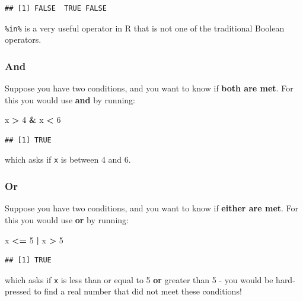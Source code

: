 \documentclass[]{book}
\newenvironment{Shaded}{\begin{snugshade}}{\end{snugshade}}
\newcommand{\DecValTok}[1]{\textcolor[rgb]{0.00,0.00,0.81}{#1}}
\newcommand{\NormalTok}[1]{#1}
\newcommand{\OperatorTok}[1]{\textcolor[rgb]{0.81,0.36,0.00}{\textbf{#1}}}
\newcommand{\StringTok}[1]{\textcolor[rgb]{0.31,0.60,0.02}{#1}}
\begin{document}
\begin{verbatim}
## [1] FALSE  TRUE FALSE
\end{verbatim}

\texttt{\%in\%} is a very useful operator in R that is not one of the traditional Boolean operators.

\hypertarget{and}{%
\subsubsection*{And}\label{and}}

Suppose you have two conditions, and you want to know if \textbf{both are met}. For this you would use \textbf{and} by running:

\begin{Shaded}
\begin{Highlighting}[]
\NormalTok{x }\OperatorTok{>}\StringTok{ }\DecValTok{4} \OperatorTok{&}\StringTok{ }\NormalTok{x }\OperatorTok{<}\StringTok{ }\DecValTok{6}
\end{Highlighting}
\end{Shaded}

\begin{verbatim}
## [1] TRUE
\end{verbatim}

which asks if \texttt{x} is between 4 and 6.

\hypertarget{or}{%
\subsubsection*{Or}\label{or}}

Suppose you have two conditions, and you want to know if \textbf{either are met}. For this you would use \textbf{or} by running:

\begin{Shaded}
\begin{Highlighting}[]
\NormalTok{x }\OperatorTok{<=}\StringTok{ }\DecValTok{5} \OperatorTok{|}\StringTok{ }\NormalTok{x }\OperatorTok{>}\StringTok{ }\DecValTok{5}
\end{Highlighting}
\end{Shaded}

\begin{verbatim}
## [1] TRUE
\end{verbatim}

which asks if \texttt{x} is less than or equal to 5 \textbf{or} greater than 5 - you would be hard-pressed to find a real number that did not meet these conditions!
\end{document}
